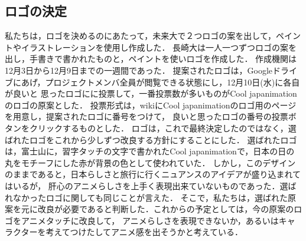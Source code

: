 \subsection{ロゴの決定}
\par
私たちは，ロゴを決めるのにあたって，未来大で２つロゴの案を出して，ペイントやイラストレーションを使用し作成した．
長崎大は一人一つずつロゴの案を出し，手書きで書かれたものと，ペイントを使いロゴを作成した．
作成機関は12月3日から12月9日までの一週間であった．
提案されたロゴは，Googleドライブにあげ，プロジェクトメンバ全員が閲覧できる状態にし，12月10日(水)に各自が良いと
思ったロゴにに投票して，一番投票数が多いものがCool japanimationのロゴの原案とした．
投票形式は，wikiにCool japanimationのロゴ用のページを用意し，提案されたロゴに番号をつけて，
良いと思ったロゴの番号の投票ボタンをクリックするものとした．
ロゴは，これで最終決定したのではなく，選ばれたロゴをこれから少しずつ改良する方針にすることにした．
選ばれたロゴは，富士山に，習字タッチの文字で書かれたCool japanimationで，日本の日の丸をモチーフにした赤が背景の色として使われていた．
しかし，このデザインのままであると，日本らしさと旅行に行くニュアンスのアイデアが盛り込まれてはいるが，
肝心のアニメらしさを上手く表現出来ていないものであった．選ばれなかったロゴに関しても同じことが言えた．
そこで，私たちは，選ばれた原案を元に改良が必要であると判断した．これからの予定としては，今の原案のロゴをアニメタッチに改良して，
アニメらしさを表現できないか，あるいはキャラクターを考えてつけたしてアニメ感を出そうかと考えている．
